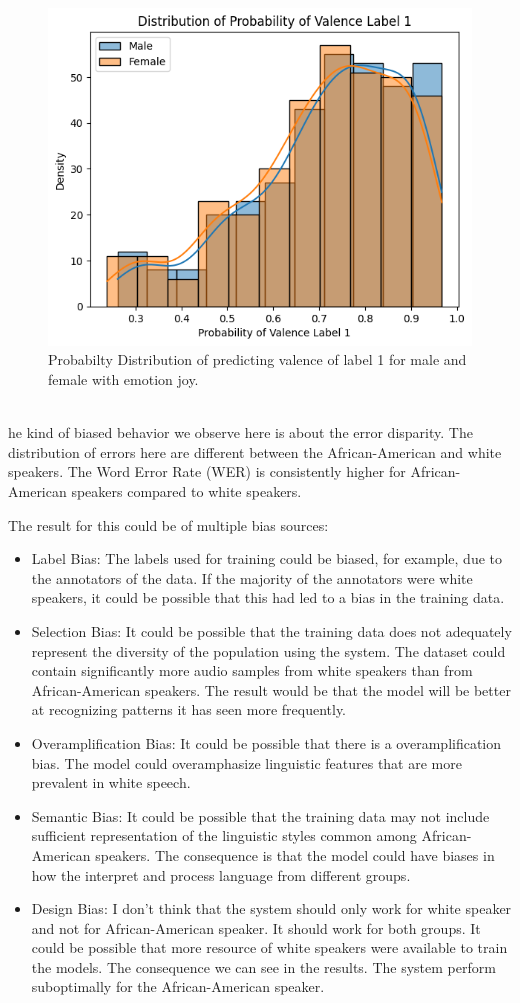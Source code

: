 \documentclass[a4 paper]{article}
\numberwithin{equation}{section}
\newcommand{\problem}[2]{~\\\fbox{\textbf{Problem #1}}\newline\newline}
\newcommand{\0}{\mathbf{0}}
\begin{document}
\begin{figure}[H]
   \centering
   \includegraphics[width=0.5\linewidth]{Probability_Dist_Valence_Label_1_Joy}
   \caption{Probabilty Distribution of predicting valence of label 1 for male and female with emotion joy.}
   \label{fig:prob_dist_valence_label_joy}
\end{figure}

\problem{3}

The kind of biased behavior we observe here is about the error disparity. The distribution of errors here are different between the African-American and white speakers. The Word Error Rate (WER) is consistently higher for African-American speakers compared to white speakers.

\hfill \break

The result for this could be of multiple bias sources:

\begin{itemize}
   \item Label Bias: The labels used for training could be biased, for example, due to the annotators of the data. If the majority of the annotators were white speakers, it could be possible that this had led to a bias in the training data.

   \item Selection Bias: It could be possible that the training data does not adequately represent the diversity of the population using the system. The dataset could contain significantly more audio samples from white speakers than from African-American speakers. The result would be that the model will be better at recognizing patterns it has seen more frequently.

   \item Overamplification Bias: It could be possible that there is a overamplification bias. The model could overamphasize linguistic features that are more prevalent in white speech.

   \item Semantic Bias: It could be possible that the training data may not include sufficient representation of the linguistic styles common among African-American speakers. The consequence is that the model could have biases in how the interpret and process language from different groups.

   \item Design Bias: I don't think that the system should only work for white speaker and not for African-American speaker. It should work for both groups. It could be possible that more resource of white speakers were available to train the models. The consequence we can see in the results. The system perform suboptimally for the African-American speaker.
\end{itemize}
\end{document}
